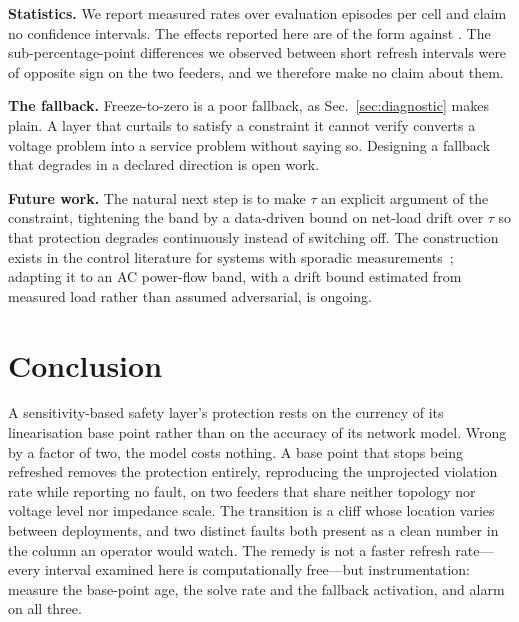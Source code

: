 \documentclass[conference,a4paper]{IEEEtran}
\begin{document}
\textbf{Statistics.} We report measured rates over \nEpisodes{} evaluation
episodes per cell and claim no confidence intervals. The effects reported here
are of the form \nLvFreshViol{} against \nLvRawViol{}. The sub-percentage-point
differences we observed between short refresh intervals were of opposite sign on
the two feeders, and we therefore make no claim about them.

\textbf{The fallback.} Freeze-to-zero is a poor fallback, as
Sec.~\ref{sec:diagnostic} makes plain. A layer that curtails to satisfy a
constraint it cannot verify converts a voltage problem into a service problem
without saying so. Designing a fallback that degrades in a declared direction is
open work.

\textbf{Future work.} The natural next step is to make $\tau$ an explicit argument
of the constraint, tightening the band by a data-driven bound on net-load drift
over $\tau$ so that protection degrades continuously instead of switching off.
The construction exists in the control literature for systems with sporadic
measurements~\cite{sporadiccbf}; adapting it to an AC power-flow band, with a
drift bound estimated from measured load rather than assumed adversarial, is
ongoing.

\section{Conclusion}

A sensitivity-based safety layer's protection rests on the currency of its
linearisation base point rather than on the accuracy of its network model. Wrong
by a factor of two, the model costs nothing. A base point that stops being
refreshed removes the protection entirely, reproducing the unprojected violation
rate while reporting no fault, on two feeders that share neither topology nor
voltage level nor impedance scale. The transition is a cliff whose location
varies between deployments, and two distinct faults both present as a clean
number in the column an operator would watch. The remedy is not a faster refresh
rate---every interval examined here is computationally free---but instrumentation:
measure the base-point age, the solve rate and the fallback activation, and alarm
on all three.

\end{document}
